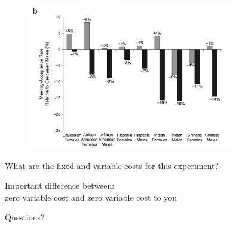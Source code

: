 \documentclass[aspectratio=169]{beamer}
\begin{document}
\begin{frame}

\begin{figure}
  \centering
  \includegraphics[width=0.8\textwidth]{figures/milkman_temporal_2012_fig2b.png}
\end{figure}

\end{frame}
\begin{frame}

What are the fixed and variable costs for this experiment?

\end{frame}
\begin{frame}

{\Large
\begin{center}
Important difference between:\\
zero variable cost and zero variable cost to you
\end{center}
}

\end{frame}
\begin{frame}

\begin{center}
\Large Questions?
\end{center}

\end{frame}
\end{document}
